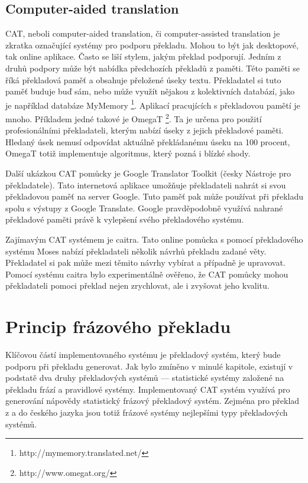\documentclass[12pt,a4paper]{report}
\def\parcite#1{\cite{#1}}  %
\begin{document}
\section{Computer-aided translation}
CAT, neboli computer-aided translation, či computer-assisted translation je zkratka označující systémy pro podporu překladu. Mohou to být jak desktopové, tak online aplikace. Často se liší stylem, jakým překlad podporují. Jedním z druhů podpory může být nabídka předchozích překladů z paměti. Této paměti se říká překladová paměť a obsahuje přeložené úseky textu. Překladatel si tuto paměť buduje buď sám, nebo může využít nějakou z kolektivních databází, jako je například databáze MyMemory \footnote{http://mymemory.translated.net/}. Aplikací pracujících s překladovou pamětí je mnoho. Příkladem jedné takové je OmegaT \footnote{http://www.omegat.org/}. Ta je určena pro použití profesionálními překladateli, kterým nabízí úseky z jejich překladové paměti. Hledaný úsek nemusí odpovídat aktuálně překládanému úseku na 100 procent, OmegaT totiž implementuje algoritmus, který pozná i blízké shody.

Další ukázkou CAT pomůcky je Google Translator Toolkit (česky Nástroje pro překladatele). Tato internetová aplikace umožňuje překladateli nahrát si svou překladovou paměť na server Google. Tuto paměť pak může používat při překladu spolu s výstupy z Google Translate. Google pravděpodobně využívá nahrané překladové paměti právě k vylepšení svého překladového systému.

Zajímavým CAT systémem je caitra\parcite{koehn:2009}. Tato online pomůcka s pomocí překladového systému Moses\parcite{koehn-EtAl:2007:PosterDemo} nabízí překladateli několik návrhů překladu zadané věty. Překladatel si pak může mezi těmito návrhy vybírat a případně je upravovat. Pomocí systému caitra bylo experimentálně ověřeno, že CAT pomůcky mohou překladateli pomoci překlad nejen zrychlovat, ale i zvyšovat jeho kvalitu\parcite{koehn:haddow:2009}.

\chapter{Princip frázového překladu}
Klíčovou částí implementovaného systému je překladový systém, který bude podporu při překladu generovat. Jak bylo zmíněno v minulé kapitole, existují v podstatě dva druhy překladových systémů --- statistické systémy založené na překladu frází a pravidlové systémy. Implementovaný CAT systém využívá pro generování nápovědy statistický frázový překladový systém. Zejména pro překlad z a do českého jazyka jsou totiž frázové systémy nejlepšími typy překladových systémů.
\end{document}

